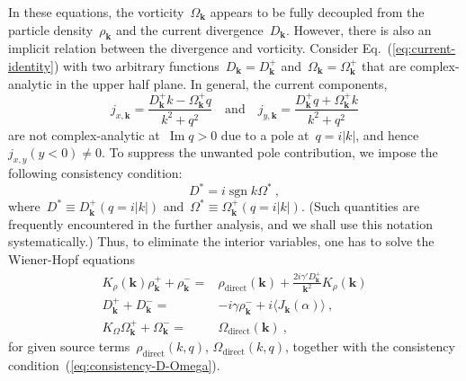 \documentclass[preprint,aps,eqsecnum]{revtex4-1}
\newcommand{\fplus}[1]{{#1}^{+}}
\newcommand{\fminus}[1]{{#1}^{-}}
\renewcommand{\Im}{\mathop{\mathrm{Im}}\nolimits}
\newcommand{\sgn}{\mathop{\mathrm{sgn}}\nolimits}
\newcommand{\dct}[1]{{#1}_\mathrm{direct}}
\begin{document}
In these equations, the vorticity~$\Omega_{\bm k}$ appears to be fully
decoupled from the particle density~$\rho_{\bm k}$
and the current divergence~$D_{\bm k}$. However, there is also an implicit
relation between the divergence and vorticity. Consider
Eq.~(\ref{eq:current-identity}) with two arbitrary
functions~$D_{\bm k} = \fplus{D}_{\bm k}$
 and~$\Omega_{\bm k} = \fplus{\Omega}_{\bm k}$ that are complex-analytic
 in the upper half plane. In general, the current components,
\begin{equation}
\label{eq:jxy}
  j_{x, {\bm k}} = \frac{\fplus{D}_{\bm k} k - \fplus{\Omega}_{\bm k} q}{k^2 + q^2}
  \quad \mathrm{and}
  \quad
  j_{y, {\bm k}} = \frac{\fplus{D}_{\bm k} q  + \fplus{\Omega}_{\bm k} k}{k^2 + q^2}
\end{equation}
are not complex-analytic at~$\Im q > 0$ due to a
pole at~$q = i |k|$, and hence $j_{x, y}(y < 0) \neq 0$.
To suppress the unwanted pole contribution, we impose
the following consistency condition:
\begin{equation}
  \label{eq:consistency-D-Omega}
  D^\ast = i \sgn k \Omega^\ast
\ , 
\end{equation}
where~$D^\ast \equiv \fplus{D}_{\bm k} (q = i |k|)$
and~$\Omega^\ast \equiv \fplus{\Omega}_{\bm k} (q = i |k|)$.
(Such quantities are frequently encountered in the further analysis,
and we shall use this notation systematically.)
Thus, to eliminate the interior variables,
one has to solve the Wiener-Hopf equations
\begin{align}
  \label{eq:wh-rho-3}
  K_\rho({\bm k}) \fplus{\rho}_{\bm k} + \fminus{\rho}_{\bm k}
  ={}& \dct{\rho}({\bm k}) + \frac{2 i \gamma' \fplus{D}_{\bm k}}{{\bm k}^2}
   K_\rho({\bm k})
  \\
  \label{eq:wh-D-3}
  \fplus{D}_{\bm k} + \fminus{D}_{\bm k}
  ={}& -i \gamma \fminus{\rho}_{\bm k} + i \langle J_{\bm k}(\alpha) \rangle \ ,
  \\
  \label{eq:wh-Omega-3}
  K_\Omega\fplus{\Omega}_{\bm k} + \fminus{\Omega}_{\bm k}
  ={}& \dct{\Omega}({\bm k})
  \ ,
\end{align}
for given source terms~$\dct{\rho}(k, q)$, $\dct{\Omega}(k, q)$, 
together with the consistency condition~(\ref{eq:consistency-D-Omega}).
\end{document}
